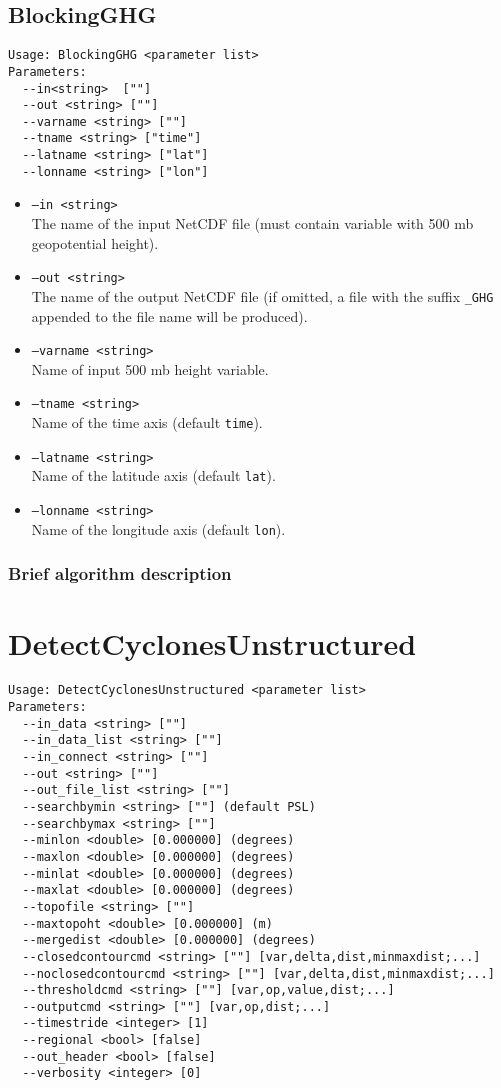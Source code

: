 \documentclass{article}
\begin{document}
\subsection{BlockingGHG}
\begin{verbatim}
Usage: BlockingGHG <parameter list>
Parameters:
  --in<string>  [""]
  --out <string> [""]
  --varname <string> [""]
  --tname <string> ["time"]
  --latname <string> ["lat"]
  --lonname <string> ["lon"]
\end{verbatim}

\begin{itemize}
\item[]\texttt{--in <string>} \\ The name of the input NetCDF file (must contain variable with 500 mb geopotential height).
\item[] \texttt{--out <string>}\\ The name of the output NetCDF file (if omitted, a file with the suffix \texttt{\_GHG} appended to the file name will be produced).
\item[] \texttt{--varname <string>}\\Name of input 500 mb height variable.
\item[] \texttt{--tname <string>}\\Name of the time axis (default \texttt{time}).
\item[]\texttt{--latname <string>}\\Name of the latitude axis (default \texttt{lat}).
\item[]\texttt{--lonname <string>}\\Name of the longitude axis (default \texttt{lon}).
\end{itemize}

\subsubsection{Brief algorithm description}

\section{DetectCyclonesUnstructured}

\begin{verbatim}
Usage: DetectCyclonesUnstructured <parameter list>
Parameters:
  --in_data <string> [""] 
  --in_data_list <string> [""]
  --in_connect <string> [""] 
  --out <string> [""] 
  --out_file_list <string> [""]
  --searchbymin <string> [""] (default PSL)
  --searchbymax <string> [""] 
  --minlon <double> [0.000000] (degrees)
  --maxlon <double> [0.000000] (degrees)
  --minlat <double> [0.000000] (degrees)
  --maxlat <double> [0.000000] (degrees)
  --topofile <string> [""] 
  --maxtopoht <double> [0.000000] (m)
  --mergedist <double> [0.000000] (degrees)
  --closedcontourcmd <string> [""] [var,delta,dist,minmaxdist;...]
  --noclosedcontourcmd <string> [""] [var,delta,dist,minmaxdist;...]
  --thresholdcmd <string> [""] [var,op,value,dist;...]
  --outputcmd <string> [""] [var,op,dist;...]
  --timestride <integer> [1] 
  --regional <bool> [false] 
  --out_header <bool> [false] 
  --verbosity <integer> [0] 
\end{verbatim}
\end{document}

